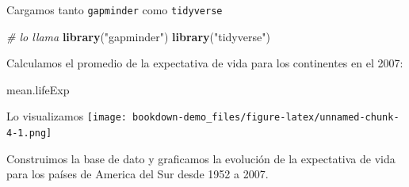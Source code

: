 \documentclass[12pt,]{book}
\newenvironment{Shaded}{\begin{snugshade}}{\end{snugshade}}
\newcommand{\KeywordTok}[1]{\textcolor[rgb]{0.13,0.29,0.53}{\textbf{#1}}}
\newcommand{\DecValTok}[1]{\textcolor[rgb]{0.00,0.00,0.81}{#1}}
\newcommand{\StringTok}[1]{\textcolor[rgb]{0.31,0.60,0.02}{#1}}
\newcommand{\CommentTok}[1]{\textcolor[rgb]{0.56,0.35,0.01}{\textit{#1}}}
\newcommand{\OperatorTok}[1]{\textcolor[rgb]{0.81,0.36,0.00}{\textbf{#1}}}
\newcommand{\NormalTok}[1]{#1}
\begin{document}
Cargamos tanto \texttt{gapminder} como \texttt{tidyverse}

\begin{Shaded}
\begin{Highlighting}[]
\CommentTok{# lo llama}
\KeywordTok{library}\NormalTok{(}\StringTok{"gapminder"}\NormalTok{)}
\KeywordTok{library}\NormalTok{(}\StringTok{"tidyverse"}\NormalTok{)}
\end{Highlighting}
\end{Shaded}

Calculamos el promedio de la expectativa de vida para los continentes en
el 2007:

\begin{Shaded}
\end{Shaded}

\begin{Shaded}
\begin{Highlighting}[]
\NormalTok{mean.lifeExp}
\end{Highlighting}
\end{Shaded}

Lo visualizamos
\texttt{[image: bookdown-demo\_files/figure-latex/unnamed-chunk-4-1.png]}

Construimos la base de dato y graficamos la evolución de la expectativa
de vida para los países de America del Sur desde 1952 a 2007.
\end{document}
